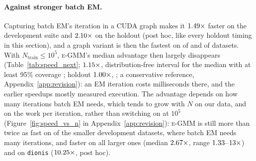 \documentclass[10pt]{article} %
\newcommand{\egmm}{\textsc{e-GMM}}
\begin{document}
\paragraph{Against stronger batch EM.} Capturing batch EM's iteration in a CUDA graph makes it $1.49\times$ faster on the development suite and $2.10\times$ on the holdout (post hoc, like every holdout timing in this section), and a graph variant is then the fastest on \rSDevGraphFastest{} of \rSnDev{} and \rSHoGraphFastest{} of \rSnHo{} datasets. With $N_{\mathrm{train}} \le 10^5$, \egmm{}'s median advantage then largely disappears (Table~\ref{tab:speed_next}; $1.15\times$, distribution-free interval for the median with at least 95\% coverage \rSDevSmallCI; holdout $1.00\times$, \rSHoSmallCI; a conservative reference, Appendix~\ref{app:revision}): an EM iteration costs milliseconds there, and the earlier speedups mostly measured execution. The advantage depends on how many iterations batch EM needs, which tends to grow with $N$ on our data, and on the work per iteration, rather than switching on at $10^5$ (Figure~\ref{fig:speed_vs_n} in Appendix~\ref{app:revision}): \egmm{} is still more than twice as fast on \rSDevSmallOverTwo{} of the smaller development datasets, where batch EM needs many iterations, and faster on all \rSnDevLarge{} larger ones (median $2.67\times$, range $1.33$--$13\times$) and on \texttt{dionis} ($10.25\times$, post hoc).
\end{document}
